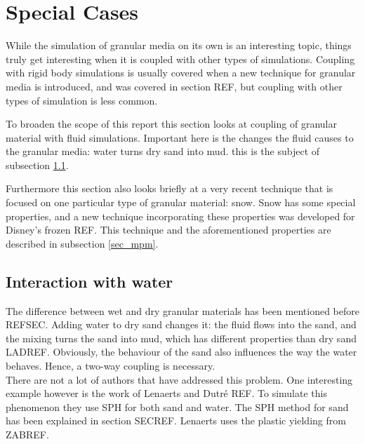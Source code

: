 \ifx\isEmbedded\undefined

\graphicspath{{../img/}}

\tableofcontents
\pagebreak

\fi

\section{Special Cases}\label{sec_specialcases}
While the simulation of granular media on its own is an interesting topic, things truly get interesting when it is coupled with other types of simulations. Coupling with rigid body simulations is usually covered when a new technique for granular media is introduced, and was covered in section REF, but coupling with other types of simulation is less common. 

To broaden the scope of this report this section looks at coupling of granular material with fluid simulations. Important here is the changes the fluid causes to the granular media: water turns dry sand into mud. this is the subject of subsection \ref{sec_ld}.

Furthermore this section also looks briefly at a very recent technique that is focused on one particular type of granular material: snow. Snow has some special properties, and a new technique incorporating these properties was developed for Disney’s frozen REF. This technique and the aforementioned properties are described in subsection \ref{sec_mpm}.

\subsection{Interaction with water} \label{sec_ld}

The difference between wet and dry granular materials has been mentioned before REFSEC. Adding water to dry sand changes it: the fluid flows into the sand, and the mixing turns the sand into mud, which has different properties than dry sand LADREF. Obviously, the behaviour of the sand also influences the way the water behaves. Hence, a two-way coupling is necessary.\\

There are not a lot of authors that have addressed this problem. One interesting example however is the work of Lenaerts and Dutr\'e REF. To simulate this phenomenon they use SPH for both sand and water. The SPH method for sand has been explained in section SECREF. Lenaerts uses the plastic yielding from ZABREF.\\

